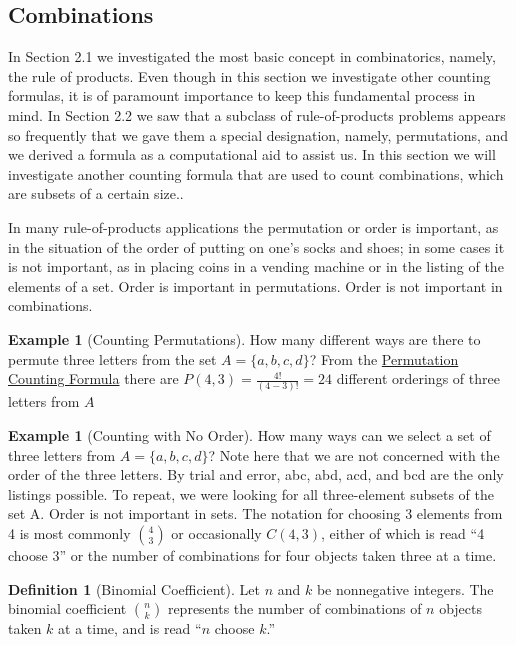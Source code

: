 \documentclass[10pt,]{book}
\theoremstyle{plain}
\theoremstyle{definition}
\newtheorem{definition}[theorem]{Definition}
\theoremstyle{definition}
\newtheorem{example}[theorem]{Example}
\theoremstyle{definition}
\begin{document}
\subsection[Combinations]{Combinations}\label{combinations}
 In Section 2.1 we investigated the most basic concept in combinatorics, namely, the rule of products. Even though in this section we investigate other counting formulas, it is of paramount importance to keep this fundamental process in mind. In Section 2.2 we saw that a subclass of rule-of-products problems appears so frequently that we gave them a special designation, namely, permutations, and we derived a formula as a computational aid to assist us. In this section we will investigate another counting formula that are used to count combinations, which are subsets of a certain size..%
\par
In many rule-of-products applications the permutation or order is important, as in the situation of the order of putting on one's socks and shoes; in some cases it is not important, as in placing coins in a vending machine or in the listing of the elements of a set. Order is important in permutations. Order is not important in combinations.%
\begin{example}[Counting Permutations]\label{counting-permuations-multiple-ways}
How many different ways are there to permute three letters from the set \(A = \{a, b, c, d\}\)?  From the \hyperref[permutations-counting-formula]{Permutation Counting Formula} there are \(P(4,3)=\frac{4!}{(4-3)!} = 24\) different orderings of three letters from \(A\) %
\end{example}
\begin{example}[Counting with No Order]\label{four-choose-three}
How many ways can we select a set of three letters from  \(A = \{a, b, c, d\}\)?  Note here that we are not concerned with the order of the three letters. By trial and error, abc, abd, acd, and bcd are the only listings possible. To repeat, we were looking for all three-element subsets of the set A. Order is not important in sets. The notation for choosing 3 elements from 4 is most commonly \(\binom{4}{3}\) or occasionally \(C(4,3)\), either of which is read ``4 choose 3'' or the number of combinations for four objects taken three at a time.%
\end{example}
\begin{definition}[Binomial Coefficient]\label{binomial-coefficient}
\label{notation-2}
Let \(n\) and \(k\) be nonnegative integers.  The binomial coefficient \(\binom{n}{k}\) represents the number of combinations of \(n\) objects taken \(k\) at a time, and is read ``\(n\) choose \(k\).''%
\end{definition}
\end{document}
